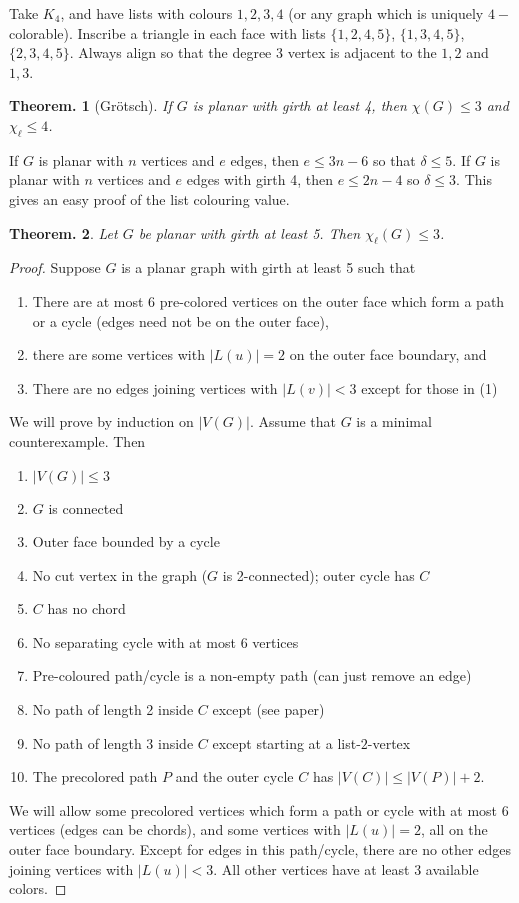 \documentclass[11pt, a4paper]{memoir}
\theoremstyle{change}
\newtheorem{theorem}{Theorem.}[section]
\theoremstyle{plain}
\theoremstyle{nonumberplain}
\newtheorem{proof}{Proof}
\numberwithin{equation}{section}
\begin{document}
Take $K_4$, and have lists with colours $1,2,3,4$ (or any graph which is uniquely $4-$colorable).
Inscribe a triangle in each face with lists $\{1,2,4,5\}$, $\{1,3,4,5\}$, $\{2,3,4,5\}$.
Always align so that the degree 3 vertex is adjacent to the $1,2$ and $1,3$.
\begin{theorem}[Gr\"otsch]
    If $G$ is planar with girth at least 4, then $\chi(G)\leq 3$ and $\chi_\ell\leq 4$.
\end{theorem}
If $G$ is planar with $n$ vertices and $e$ edges, then $e\leq 3n-6$ so that $\delta\leq 5$.
If $G$ is planar with $n$ vertices and $e$ edges with girth 4, then $e\leq 2n-4$ so $\delta\leq 3$.
This gives an easy proof of the list colouring value.
\begin{theorem}
    Let $G$ be planar with girth at least 5.
    Then $\chi_\ell(G)\leq 3$.
\end{theorem}
\begin{proof}
    Suppose $G$ is a planar graph with girth at least 5 such that
    \begin{enumerate}[nl]
        \item There are at most 6 pre-colored vertices on the outer face which form a path or a cycle (edges need not be on the outer face),
        \item there are some vertices with $|L(u)|=2$ on the outer face boundary, and
        \item There are no edges joining vertices with $|L(v)|<3$ except for those in (1)
    \end{enumerate}
    We will prove by induction on $|V(G)|$.
    Assume that $G$ is a minimal counterexample.
    Then
    \begin{enumerate}[nl]
        \item $|V(G)|\leq 3$
        \item $G$ is connected
        \item Outer face bounded by a cycle
        \item No cut vertex in the graph ($G$ is 2-connected); outer cycle has $C$
        \item $C$ has no chord
        \item No separating cycle with at most 6 vertices
        \item Pre-coloured path/cycle is a non-empty path (can just remove an edge)
        \item No path of length 2 inside $C$ except (see paper)
        \item No path of length 3 inside $C$ except starting at a list-$2$-vertex
        \item The precolored path $P$ and the outer cycle $C$ has $|V(C)|\leq|V(P)|+2$.
    \end{enumerate}


    We will allow some precolored vertices which form a path or cycle with at most 6 vertices (edges can be chords), and some vertices with $|L(u)|=2$, all on the outer face boundary.
    Except for edges in this path/cycle, there are no other edges joining vertices with $|L(u)|< 3$.
    All other vertices have at least 3 available colors.
\end{proof}
\end{document}
